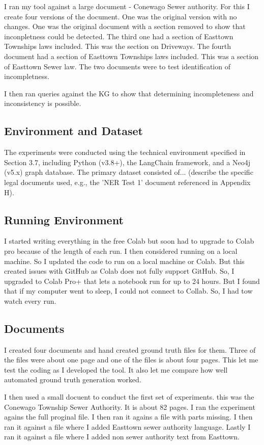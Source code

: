 I ran my tool against a large document - Conewago Sewer authority. For this I create four versions of the document. One was the original version with no changes. One was the original document with a section removed to show that inconpletness could be detected. The third one had a section of Easttown Townships laws included. This was the section on Driveways. The fourth document had a section of Easttown Townships laws included. This was a section of Easttown Sewer law. The two documents were to test identification of incompletness.

I then ran queries against the KG to show that determining incompleteness and inconsistency is possible.

\subsection{Environment and Dataset}
The experiments were conducted using the technical environment specified in Section 3.7, including Python (v3.8+), the LangChain framework, and a Neo4j (v5.x) graph database. The primary dataset consisted of... (describe the specific legal documents used, e.g., the 'NER Test 1' document referenced in Appendix H).

\subsection{Running Environment}
I started writing everything in the free Colab but soon had to upgrade to Colab pro because of the length of each run. I then considered running on a local machine. So I updated the code to run on a local machine or Colab. But this created issues with GitHub as Colab does not fully support GitHub. So, I upgraded to Colab Pro+ that lets a notebook run for up to 24 hours. But I found that if my computer went to sleep, I could not connect to Collab. So, I had tow watch every run.

\subsection{Documents}
I created four documents and hand created ground truth files for them. Three of the files were about one page and one of the files is about four pages. This let me test the coding as I developed the tool. It also let me compare how well automated ground truth generation worked.

I then used a small docuent to conduct the first set of experiments. this was the Conewago Township Sewer Authority. It is about 82 pages. I ran the experiment agains the full proginal file. I then ran it agains a file with parts missing. I then ran it against a file where I added Easttown sewer authority language. Lastly I ran it against a file where I added non sewer authority text from Easttown.

